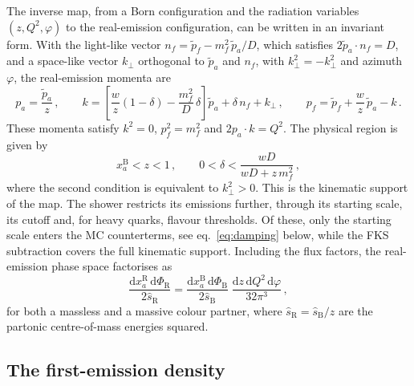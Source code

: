 \documentclass[a4paper,11pt]{article}
\newcommand{\dd}{\mathrm{d}}
\newcommand{\kt}{k_\perp}
\newcommand{\PhiB}{\Phi_{\mathrm{B}}}
\newcommand{\PhiR}{\Phi_{\mathrm{R}}}
\begin{document}
The inverse map, from a Born configuration and the radiation
variables $(z,Q^2,\varphi)$ to the real-emission configuration, can be
written in an invariant form. With the light-like vector $n_f=\tilde
p_f-m_f^2\,\tilde p_a/D$, which satisfies $2\tilde p_a\cdot n_f=D$, and
a space-like vector $k_\perp$ orthogonal to $\tilde p_a$ and $n_f$, with
$k_\perp^2=-\kt^2$ and azimuth $\varphi$, the real-emission momenta are
\begin{equation}
  p_a=\frac{\tilde p_a}{z}\,,\qquad
  k=\left[\frac{w}{z}(1-\delta)-\frac{m_f^2}{D}\,\delta\right]\tilde p_a
  +\delta\,n_f+k_\perp\,,\qquad
  p_f=\tilde p_f+\frac{w}{z}\,\tilde p_a-k\,.
  \label{eq:inverse}
\end{equation}
These momenta satisfy $k^2=0$, $p_f^2=m_f^2$ and $2p_a\cdot k=Q^2$. The
physical region is given by
\begin{equation}
  x_a^{\mathrm{B}}<z<1\,,\qquad
  0<\delta<\frac{wD}{wD+z\,m_f^2}\,,
  \label{eq:support}
\end{equation}
where the second condition is equivalent to $\kt^2>0$. This is the
kinematic support of the map. The shower restricts its emissions
further, through its starting scale, its cutoff and, for heavy quarks,
flavour thresholds. Of these, only the starting scale enters the MC
counterterms, see eq.~\eqref{eq:damping} below, while the FKS
subtraction covers the full kinematic support. Including the flux
factors, the real-emission phase space factorises as
\begin{equation}
  \frac{\dd x_a^{\mathrm{R}}\,\dd\PhiR}{2\hat s_{\mathrm{R}}}
  =\frac{\dd x_a^{\mathrm{B}}\,\dd\PhiB}{2\hat s_{\mathrm{B}}}\;
  \frac{\dd z\,\dd Q^2\,\dd\varphi}{32\pi^3}\,,
  \label{eq:measure}
\end{equation}
for both a massless and a massive colour partner, where $\hat
s_{\mathrm{R}}=\hat s_{\mathrm{B}}/z$ are the partonic centre-of-mass
energies squared.

\subsection{The first-emission density}
\label{sec:density}
\end{document}
